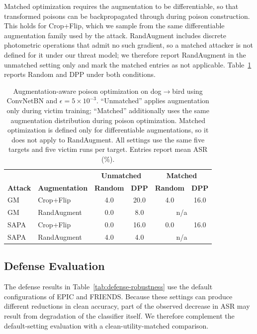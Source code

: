 Matched optimization requires the augmentation to be differentiable, so
that transformed poisons can be backpropagated through during poison
construction. This holds for Crop+Flip, which we sample from the same
differentiable augmentation family used by the attack. RandAugment
includes discrete photometric operations that admit no such gradient, so
a matched attacker is not defined for it under our threat model; we
therefore report RandAugment in the unmatched setting only and mark the
matched entries as not applicable. Table~\ref{tab:augmentation-aware}
reports Random and DPP under both conditions.

\begin{table}[t]
\centering
\caption{
Augmentation-aware poison optimization on dog$\rightarrow$bird using
ConvNetBN and $\epsilon=5\times10^{-3}$. ``Unmatched'' applies
augmentation only during victim training; ``Matched'' additionally uses
the same augmentation distribution during poison optimization. Matched
optimization is defined only for differentiable augmentations, so it does
not apply to RandAugment. All settings use the same five targets and five
victim runs per target. Entries report mean ASR (\%).
}
\label{tab:augmentation-aware}
\small
\setlength{\tabcolsep}{5.5pt}
\renewcommand{\arraystretch}{1.08}
\begin{tabular}{ll|cc|cc}
\toprule
&
&
\multicolumn{2}{c|}{\textbf{Unmatched}} &
\multicolumn{2}{c}{\textbf{Matched}} \\
\textbf{Attack} &
\textbf{Augmentation} &
\textbf{Random} & \textbf{DPP} &
\textbf{Random} & \textbf{DPP} \\
\midrule
GM   & Crop+Flip   & 4.0 & 20.0 & 4.0 & 16.0 \\
GM   & RandAugment & 0.0 & 8.0 & \multicolumn{2}{c}{n/a} \\
\midrule
SAPA & Crop+Flip   & 0.0 & 16.0 & 0.0 & 16.0 \\
SAPA & RandAugment & 4.0 & 4.0 & \multicolumn{2}{c}{n/a} \\
\bottomrule
\end{tabular}
\end{table}


\subsection{Defense Evaluation}
\label{sec:utility-matched-defense}

The defense results in Table~\ref{tab:defense-robustness} use the
default configurations of EPIC and FRIENDS. Because these settings can
produce different reductions in clean accuracy, part of the observed
decrease in ASR may result from degradation of the classifier itself.
We therefore complement the default-setting evaluation with a
clean-utility-matched comparison.


